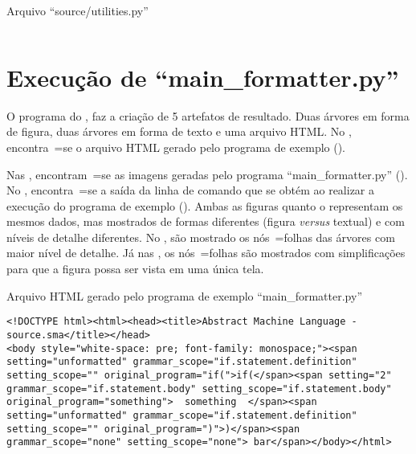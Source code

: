 \begin{code}
\caption{Arquivo ``source/utilities.py''}
\label{code:utilitiesPy}
\inputminted[firstline=39,firstnumber=1]{python3}{../source/utilities.py}
\end{code}


\chapter[main\_formatter.py]{Execução de ``main\_formatter.py''}
\label{chapter:execucaoDeMainFormatter}

O programa do ,
faz a criação de 5 artefatos de resultado.
Duas árvores em forma de figura,
duas árvores em forma de texto e
uma arquivo HTML.
No ,
encontra~=se o arquivo HTML gerado pelo programa de exemplo ().

Nas ,
encontram~=se as imagens geradas pelo programa ``main\_formatter.py'' ().
No ,
encontra~=se a saída da linha de comando que se obtém ao realizar a execução do programa de exemplo ().
Ambas as figuras  quanto o  representam os mesmos dados,
mas mostrados de formas diferentes (figura \textit{versus} textual) e
com níveis de detalhe diferentes.
No ,
são mostrado os nós~=folhas das árvores com maior nível de detalhe.
Já nas ,
os nós~=folhas são mostrados com simplificações para que a figura possa ser vista em uma única tela.
\begin{code}
\caption{Arquivo HTML gerado pelo programa de exemplo ``main\_formatter.py''}
\label{code:MainFormatterHtml}
\begin{verbatim}
<!DOCTYPE html><html><head><title>Abstract Machine Language - source.sma</title></head>
<body style="white-space: pre; font-family: monospace;"><span setting="unformatted" grammar_scope="if.statement.definition" setting_scope="" original_program="if(">if(</span><span setting="2" grammar_scope="if.statement.body" setting_scope="if.statement.body" original_program="something">  something  </span><span setting="unformatted" grammar_scope="if.statement.definition" setting_scope="" original_program=")">)</span><span grammar_scope="none" setting_scope="none"> bar</span></body></html>
\end{verbatim}
\end{code}

